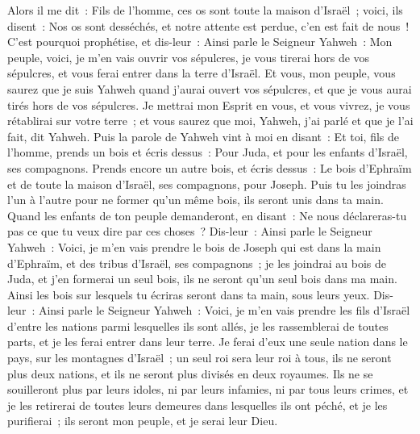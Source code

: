 \begin{multicols}{2}
Alors il me dit~: Fils de l'homme, ces os sont toute la maison d'Israël~; voici, ils disent~: Nos os sont desséchés, et notre attente est perdue, c'en est fait de nous~!
C'est pourquoi prophétise, et dis-leur~: Ainsi parle le Seigneur Yahweh~: Mon peuple, voici, je m'en vais ouvrir vos sépulcres, je vous tirerai hors de vos sépulcres, et vous ferai entrer dans la terre d'Israël.
Et vous, mon peuple, vous saurez que je suis Yahweh quand j'aurai ouvert vos sépulcres, et que je vous aurai tirés hors de vos sépulcres.
Je mettrai mon Esprit en vous, et vous vivrez, je vous rétablirai sur votre terre~; et vous saurez que moi, Yahweh, j'ai parlé et que je l'ai fait, dit Yahweh.
Puis la parole de Yahweh vint à moi en disant~:
Et toi, fils de l'homme, prends un bois et écris dessus~: Pour Juda, et pour les enfants d'Israël, ses compagnons. Prends encore un autre bois, et écris dessus~: Le bois d'Ephraïm et de toute la maison d'Israël, ses compagnons, pour Joseph.
Puis tu les joindras l'un à l'autre pour ne former qu'un même bois, ils seront unis dans ta main.
Quand les enfants de ton peuple demanderont, en disant~: Ne nous déclareras-tu pas ce que tu veux dire par ces choses~?
Dis-leur~: Ainsi parle le Seigneur Yahweh~: Voici, je m'en vais prendre le bois de Joseph qui est dans la main d'Ephraïm, et des tribus d'Israël, ses compagnons~; je les joindrai au bois de Juda, et j'en formerai un seul bois, ils ne seront qu'un seul bois dans ma main.
Ainsi les bois sur lesquels tu écriras seront dans ta main, sous leurs yeux.
Dis-leur~: Ainsi parle le Seigneur Yahweh~: Voici, je m'en vais prendre les fils d'Israël d'entre les nations parmi lesquelles ils sont allés, je les rassemblerai de toutes parts, et je les ferai entrer dans leur terre.
Je ferai d'eux une seule nation dans le pays, sur les montagnes d'Israël~; un seul roi sera leur roi à tous, ils ne seront plus deux nations, et ils ne seront plus divisés en deux royaumes.
Ils ne se souilleront plus par leurs idoles, ni par leurs infamies, ni par tous leurs crimes, et je les retirerai de toutes leurs demeures dans lesquelles ils ont péché, et je les purifierai~; ils seront mon peuple, et je serai leur Dieu.

\end{multicols}
